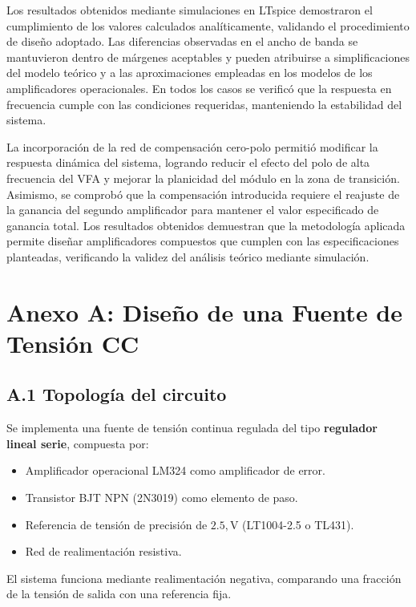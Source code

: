 \documentclass[12pt,a4paper]{article}
\begin{document}
Los resultados obtenidos mediante simulaciones en LTspice demostraron el cumplimiento de los valores calculados analíticamente, validando el procedimiento de diseño adoptado. Las diferencias observadas en el ancho de banda se mantuvieron dentro de márgenes aceptables y pueden atribuirse a simplificaciones del modelo teórico y a las aproximaciones empleadas en los modelos de los amplificadores operacionales. En todos los casos se verificó que la respuesta en frecuencia cumple con las condiciones requeridas, manteniendo la estabilidad del sistema. 

La incorporación de la red de compensación cero-polo permitió modificar la respuesta dinámica del sistema, logrando reducir el efecto del polo de alta frecuencia del VFA y mejorar la planicidad del módulo en la zona de transición. Asimismo, se comprobó que la compensación introducida requiere el reajuste de la ganancia del segundo amplificador para mantener el valor especificado de ganancia total. Los resultados obtenidos demuestran que la metodología aplicada permite diseñar amplificadores compuestos que cumplen con las especificaciones planteadas, verificando la validez del análisis teórico mediante simulación. 

\newpage

\section*{Anexo A: Diseño de una Fuente de Tensión CC}

\subsection*{A.1 Topología del circuito}

Se implementa una fuente de tensión continua regulada del tipo \textbf{regulador lineal serie}, compuesta por:

\begin{itemize}
\item Amplificador operacional LM324 como amplificador de error.
\item Transistor BJT NPN (2N3019) como elemento de paso.
\item Referencia de tensión de precisión de $2.5,\mathrm{V}$ (LT1004-2.5 o TL431).
\item Red de realimentación resistiva.
\end{itemize}

El sistema funciona mediante realimentación negativa, comparando una fracción de la tensión de salida con una referencia fija.
\end{document}
